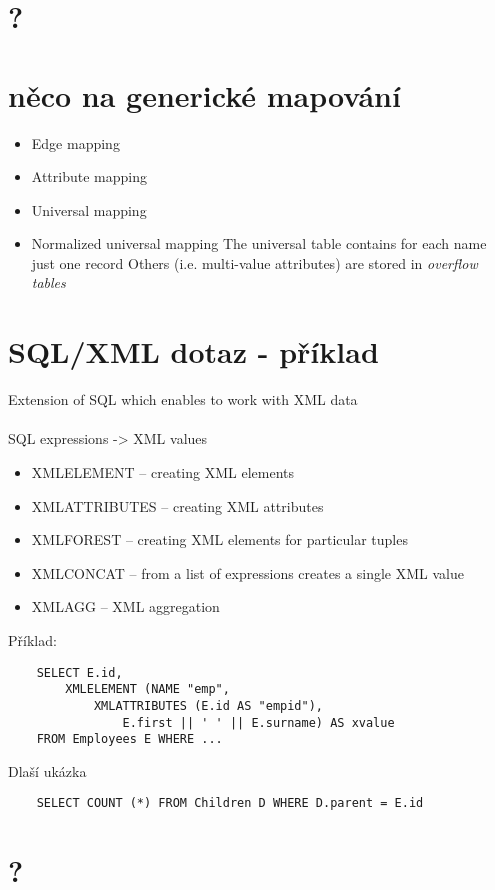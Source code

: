 \documentclass[a4paper,titlepage]{article}
\begin{document}
	
\section{?}
\section{něco na generické mapování  }
	\begin{itemize}
  		 \item{Edge mapping}
  		 \item{Attribute mapping}
  		 \item{Universal mapping}
  		 \item{Normalized universal mapping}
    		\subitem The universal table contains for each name just one record
 						Others (i.e. multi-value attributes) are stored in \textit{overflow tables}

	\end{itemize}
\section{SQL/XML dotaz - příklad  }
	Extension of SQL which enables to work with XML data\\
	\\
	SQL expressions -> XML values
	\begin{itemize}
  		 \item XMLELEMENT – creating XML elements
  		 \item XMLATTRIBUTES – creating XML attributes
  		 \item XMLFOREST – creating XML elements for particular tuples
  		 \item XMLCONCAT – from a list of expressions creates a single XML value
  		 \item XMLAGG – XML aggregation
	\end{itemize}
	
	Příklad:
	\begin{lstlisting}
	SELECT E.id,
 		XMLELEMENT (NAME "emp",
 			XMLATTRIBUTES (E.id AS "empid"),
 				E.first || ' ' || E.surname) AS xvalue
	FROM Employees E WHERE ...
	\end{lstlisting}
	Dlaší ukázka
	\begin{lstlisting}
	SELECT COUNT (*) FROM Children D WHERE D.parent = E.id 
	\end{lstlisting}
	
	
\section{?}
\end{document}
